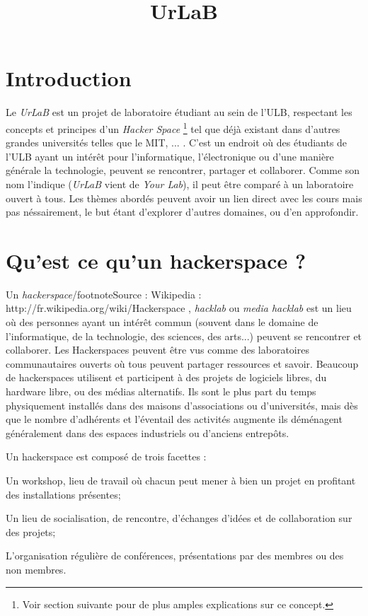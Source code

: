 \documentclass[a4paper]{article}
\title{UrLaB}  %
\begin{document}
\maketitle
\newpage
\tableofcontents 
\newpage
\section{Introduction}
Le  \emph{UrLaB} est un projet de laboratoire étudiant au sein de l'ULB,  respectant les concepts et principes d'un \emph{Hacker Space}  \footnote{Voir section suivante pour de plus amples explications sur ce  concept.} tel que déjà existant dans d'autres grandes universités telles  que le MIT, ... . %
C'est  un endroit où des étudiants de l’ULB ayant un intérêt pour  l’informatique, l’électronique ou d’une manière générale la  technologie, peuvent se rencontrer, partager et collaborer. 
Comme son nom l'indique (\emph{UrLaB} vient de \emph{Your Lab}), il peut être comparé à un laboratoire ouvert à tous.
 Les  thèmes abordés peuvent avoir un lien direct avec les cours mais pas  néssairement, le but étant d’explorer d’autres domaines, ou d’en  approfondir.

\section{Qu'est ce qu'un hackerspace ?}

Un \emph{hackerspace}/footnote{Source : Wikipedia : http://fr.wikipedia.org/wiki/Hackerspace }, \emph{hacklab} ou \emph{media hacklab}  est un lieu où des personnes ayant un intérêt commun (souvent dans le  domaine de l'informatique, de la technologie, des sciences, des arts...)  peuvent se rencontrer et collaborer. Les Hackerspaces peuvent être vus  comme des laboratoires communautaires ouverts où tous peuvent partager  ressources et savoir. Beaucoup de hackerspaces utilisent et participent à  des projets de logiciels libres, du hardware libre, ou des médias  alternatifs.
Ils sont le plus part du temps physiquement installés dans des maisons d'associations ou d'universités, mais dès que le nombre d'adhérents et  l'éventail des activités augmente ils déménagent généralement dans des  espaces industriels ou d'anciens entrepôts.

\begin{list}{-}{} Un hackerspace est composé de trois facettes :
\item Un workshop, lieu de travail où chacun peut mener à bien un projet en profitant des installations présentes;
\item Un lieu de socialisation, de rencontre, d\rq{}échanges d'idées et de collaboration sur des projets;
\item L’organisation régulière de conférences, présentations par des membres ou des non membres.
\end{list}
\end{document}
